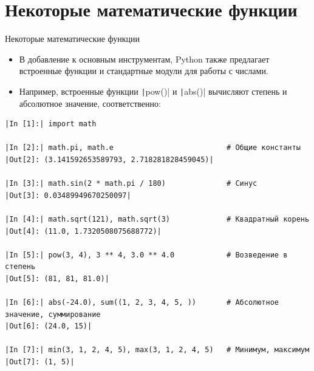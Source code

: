\documentclass[aspectratio=169]{beamer}	%
\begin{document}
\section{Некоторые математические функции}
\sectionframe

\begin{frame}[fragile]{Некоторые математические функции}
\scriptsize
\begin{itemize}
	\item В добавление к основным инструментам, Python также предлагает встроенные функции и стандартные модули для работы с числами.
	\item Например, встроенные функции \texttt|pow()| и \texttt|abs()| вычисляют степень и абсолютное значение, соответственно:
\end{itemize}
\begin{verbatim}
|In [1]:| import math

|In [2]:| math.pi, math.e                          # Общие константы
|Out[2]: (3.141592653589793, 2.718281828459045)|

|In [3]:| math.sin(2 * math.pi / 180)              # Синус
|Out[3]: 0.03489949670250097|

|In [4]:| math.sqrt(121), math.sqrt(3)             # Квадратный корень
|Out[4]: (11.0, 1.7320508075688772)|

|In [5]:| pow(3, 4), 3 ** 4, 3.0 ** 4.0            # Возведение в степень
|Out[5]: (81, 81, 81.0)|

|In [6]:| abs(-24.0), sum((1, 2, 3, 4, 5, ))       # Абсолютное значение, суммирование
|Out[6]: (24.0, 15)|

|In [7]:| min(3, 1, 2, 4, 5), max(3, 1, 2, 4, 5)   # Минимум, максимум
|Out[7]: (1, 5)|
\end{verbatim}
\vfill
\end{frame}
\end{document}

